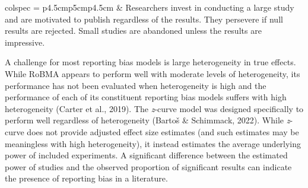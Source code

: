 \documentclass[
  doc, donotrepeattitle,floatsintext]{apa7}
\begin{document}
\begin{longtblr}[
  caption = {The selection and regression models used in our robust Bayesian meta-analysis approach.},
  label = {tab:table1},
]{colspec = {p{4.5cm}p{5cm}p{4.5cm}}}
   &
  Researchers invest in conducting a large study and are motivated to publish regardless of the results. They persevere if null results are rejected. Small studies are abandoned unless the results are impressive. \\
\bottomrule
\end{longtblr}

\clearpage

\normalsize

A challenge for most reporting bias models is large heterogeneity in true effects. While RoBMA appears to perform well with moderate levels of heterogeneity, its performance has not been evaluated when heterogeneity is high and the performance of each of its constituent reporting bias models suffers with high heterogeneity (Carter et al., 2019). The \emph{z}-curve model was designed specifically to perform well regardless of heterogeneity (Bartoš \& Schimmack, 2022). While \emph{z}-curve does not provide adjusted effect size estimates (and such estimates may be meaningless with high heterogeneity), it instead estimates the average underlying power of included experiments. A significant difference between the estimated power of studies and the observed proportion of significant results can indicate the presence of reporting bias in a literature.
\end{document}
